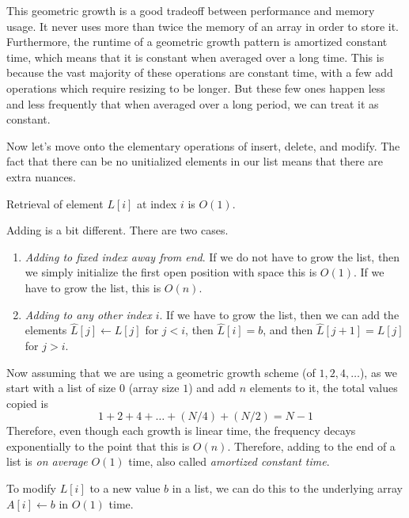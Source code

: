   This geometric growth is a good tradeoff between performance and memory usage. It never uses more than twice the memory of an array in order to store it. Furthermore, the runtime of a geometric growth pattern is amortized constant time, which means that it is constant when averaged over a long time. This is because the vast majority of these operations are constant time, with a few add operations which require resizing to be longer. But these few ones happen less and less frequently that when averaged over a long period, we can treat it as constant. 

  Now let's move onto the elementary operations of insert, delete, and modify. The fact that there can be no unitialized elements in our list means that there are extra nuances. 

  \begin{algo}
    Retrieval of element $L[i]$ at index $i$ is $O(1)$. 
  \end{algo}

  \begin{algo}
    Adding is a bit different. There are two cases. 
    \begin{enumerate}
      \item \textit{Adding to fixed index away from end}. If we do not have to grow the list, then we simply initialize the first open position with space this is $O(1)$. If we have to grow the list, this is $O(n)$.  
      \item \textit{Adding to any other index $i$}. If we have to grow the list, then we can add the elements $\hat{L}[j] \gets L[j]$ for $j < i$, then $\hat{L}[i] = b$, and then $\hat{L}[j+1] = L[j]$ for $j > i$. 
    \end{enumerate}

    Now assuming that we are using a geometric growth scheme (of $1, 2, 4, \ldots$), as we start with a list of size $0$ (array size $1$) and add $n$ elements to it, the total values copied is
    \begin{equation}
      1 + 2 + 4 + \ldots + (N/4) + (N/2) = N - 1
    \end{equation}
    Therefore, even though each growth is linear time, the frequency decays exponentially to the point that this is $O(n)$. Therefore, adding to the end of a list is \textit{on average} $O(1)$ time, also called \textit{amortized constant time}. 
  \end{algo}

  \begin{algo}
    To modify $L[i]$ to a new value $b$ in a list, we can do this to the underlying array $A[i] \gets b$ in $O(1)$ time. 
  \end{algo}


